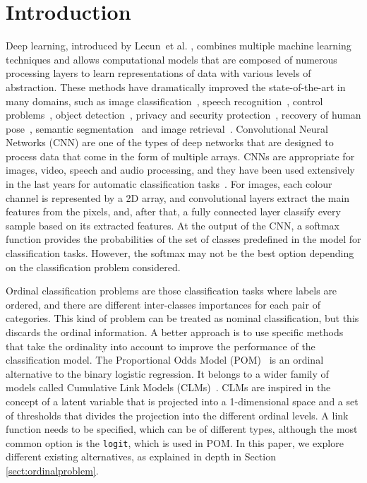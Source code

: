 \documentclass[preprint]{elsarticle}
\begin{document}
\section{Introduction}
\label{sect:introduction}
Deep learning, introduced by Lecun~et al. \cite{lecun2015deep}, combines multiple machine learning techniques and allows computational models that are composed of numerous processing layers to learn representations of data with various levels of abstraction. These methods have dramatically improved the state-of-the-art in many domains, such as image classification~\cite{yu2017convolutional,fang2019image,zhu2019image}, speech recognition~\cite{song2018music,liu2018speech}, control problems~\cite{mnih2015human}, object detection~\cite{sun2018face,chu2018deep,olmos2018automatic}, privacy and security protection~\cite{tan2018deep,yuan2019adversarial}, recovery of human pose~\cite{hong2015multimodal}, semantic segmentation~\cite{li2019deep} and image retrieval~\cite{tzelepi2018deep,qayyum2017medical,bai2018optimization}. Convolutional Neural Networks (CNN) are one of the types of deep networks that are designed to process data that come in the form of multiple arrays. CNNs are appropriate for images, video, speech and audio processing, and they have been used extensively in the last years for automatic classification tasks~\cite{dong2014learning,ronneberger2015u}. For images, each colour channel is represented by a 2D array, and convolutional layers extract the main features from the pixels, and, after that, a fully connected layer classify every sample based on its extracted features. At the output of the CNN, a softmax function provides the probabilities of the set of classes predefined in the model for classification tasks. However, the softmax may not be the best option depending on the classification problem considered.

Ordinal classification problems are those classification tasks where labels are ordered, and there are different inter-classes importances for each pair of categories. This kind of problem can be treated as nominal classification, but this discards the ordinal information. A better approach is to use specific methods that take the ordinality into account to improve the performance of the classification model. The Proportional Odds Model (POM)~\cite{mccullagh1980regression} is an ordinal alternative to the binary logistic regression. It belongs to a wider family of models called Cumulative Link Models (CLMs)~\cite{agresti2010analysis}. CLMs are inspired in the concept of a latent variable that is projected into a 1-dimensional space and a set of thresholds that divides the projection into the different ordinal levels. A link function needs to be specified, which can be of different types, although the most common option is the \texttt{logit}, which is used in POM. In this paper, we explore different existing alternatives, as explained in depth in Section \ref{sect:ordinalproblem}.
\end{document}
